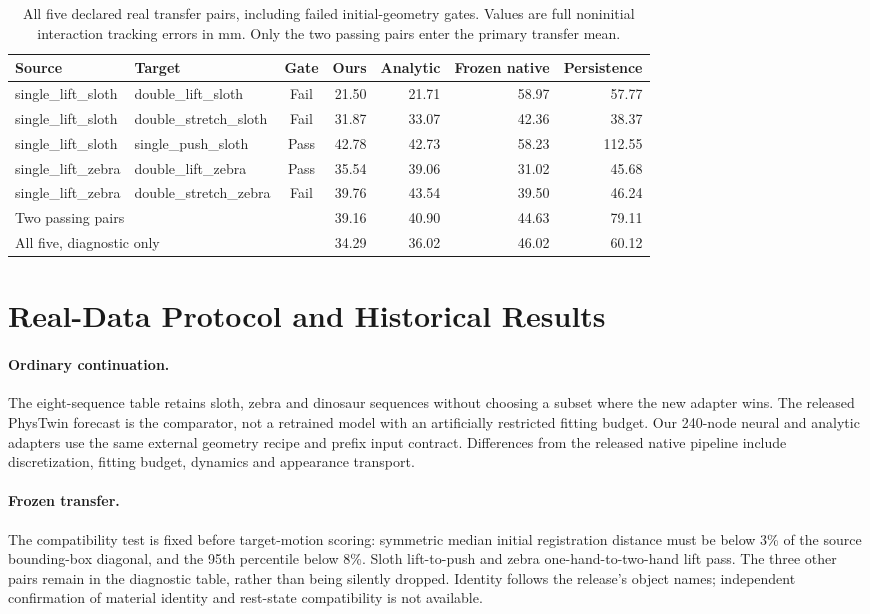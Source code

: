 \documentclass[10pt,twocolumn,letterpaper]{article}
\begin{document}
\begin{table}[!t]
\centering\small\setlength{\tabcolsep}{3pt}\setlength{\tabcolsep}{4pt}
\caption{All five declared real transfer pairs, including failed initial-geometry gates. Values are full noninitial interaction tracking errors in mm. Only the two passing pairs enter the primary transfer mean.}
\begin{tabular}{llcrrrr}\toprule
Source & Target & Gate & Ours & Analytic & Frozen native & Persistence\\\midrule
single\_lift\_sloth & double\_lift\_sloth & Fail & 21.50 & 21.71 & 58.97 & 57.77\\
single\_lift\_sloth & double\_stretch\_sloth & Fail & 31.87 & 33.07 & 42.36 & 38.37\\
single\_lift\_sloth & single\_push\_sloth & Pass & 42.78 & 42.73 & 58.23 & 112.55\\
single\_lift\_zebra & double\_lift\_zebra & Pass & 35.54 & 39.06 & 31.02 & 45.68\\
single\_lift\_zebra & double\_stretch\_zebra & Fail & 39.76 & 43.54 & 39.50 & 46.24\\
\midrule\multicolumn{3}{l}{Two passing pairs} &39.16&40.90&44.63&79.11\\
\multicolumn{3}{l}{All five, diagnostic only} &34.29&36.02&46.02&60.12\\\bottomrule
\end{tabular}
\end{table}
\section{Real-Data Protocol and Historical Results}
\paragraph{Ordinary continuation.}
The eight-sequence table retains sloth, zebra and dinosaur sequences without choosing a subset where the new adapter wins. The released PhysTwin forecast is the comparator, not a retrained model with an artificially restricted fitting budget. Our 240-node neural and analytic adapters use the same external geometry recipe and prefix input contract. Differences from the released native pipeline include discretization, fitting budget, dynamics and appearance transport.

\paragraph{Frozen transfer.}
The compatibility test is fixed before target-motion scoring: symmetric median initial registration distance must be below 3\% of the source bounding-box diagonal, and the 95th percentile below 8\%. Sloth lift-to-push and zebra one-hand-to-two-hand lift pass. The three other pairs remain in the diagnostic table, rather than being silently dropped. Identity follows the release's object names; independent confirmation of material identity and rest-state compatibility is not available.
\end{document}
